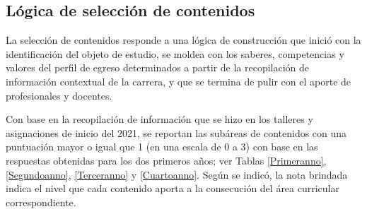 \begin{refsection}

\section{Lógica de selección de contenidos}

La selección de contenidos responde a una lógica de construcción que inició con la identificación del objeto de estudio, se moldea con los saberes, competencias y valores del perfil de egreso determinados a partir de la recopilación de información contextual de la carrera, y que se termina de pulir con el aporte de profesionales y docentes.

Con base en la recopilación de información que se hizo en los talleres y asignaciones de inicio del 2021, se reportan las subáreas de contenidos con una puntuación mayor o igual que 1 (en una escala de 0 a 3) con base en las respuestas obtenidas para los dos primeros años; ver Tablas \ref{Primeranno}, \ref{Segundoanno}, \ref{Terceranno} y \ref{Cuartoanno}. Según se indicó, la nota brindada indica el nivel que cada contenido aporta a la consecución del área curricular correspondiente.


\end{refsection}
